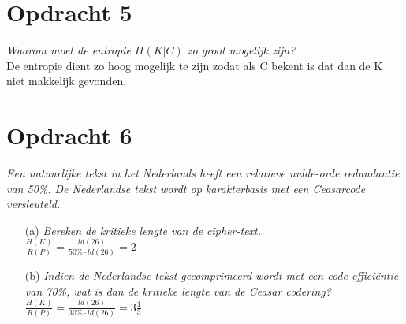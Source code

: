 \section{Opdracht 5}
\emph{Waarom moet de entropie $H(K|C)$ zo groot mogelijk zijn?}\\
De entropie dient zo hoog mogelijk te zijn zodat als C bekent is dat dan de K niet makkelijk gevonden.

\section{Opdracht 6}
\emph{Een natuurlijke tekst in het Nederlands heeft een relatieve nulde-orde redundantie van 50\%. De Nederlandse tekst wordt op karakterbasis met een Ceasarcode versleuteld.}\\
\begin{itemize}
  \item[(a)] \emph{Bereken de kritieke lengte van de cipher-text.}\\
    $\frac{H(K)}{R(P)}=\frac{ld(26)}{50\% \cdot ld(26)}=2$
    
  \item[(b)] \emph{Indien de Nederlandse tekst gecomprimeerd wordt met een code-effici\"{e}ntie van 70\%, wat is dan de kritieke lengte van de Ceasar codering?}\\
    $\frac{H(K)}{R(P)}=\frac{ld(26)}{30\% \cdot ld(26)}=3\frac{1}{3}$
\end{itemize}
